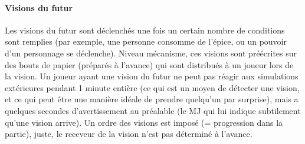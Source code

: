 {%
	
	
	
	
	\paragraph{Visions du futur} Les visions du futur sont déclenchés une fois un certain nombre de conditions sont remplies (par exemple, une personne consomme de l'épice, ou un pouvoir d'un personnage se déclenche). Niveau mécanisme, ces visions sont préécrites sur des bouts de papier (préparés à l'avance) qui sont distribués à un joueur lors de la vision. Un joueur ayant une vision du futur ne peut pas réagir aux simulations extérieures pendant 1 minute entière (ce qui est un moyen de détecter une vision, et ce qui peut être une manière idéale de prendre quelqu'un par surprise), mais a quelques secondes d'avertissement au préalable (le MJ qui lui indique subtilement qu'une vision arrive). Un ordre des visions est imposé (= progression dans la partie), juste, le receveur de la vision n'est pas déterminé à l'avance.
	
}
